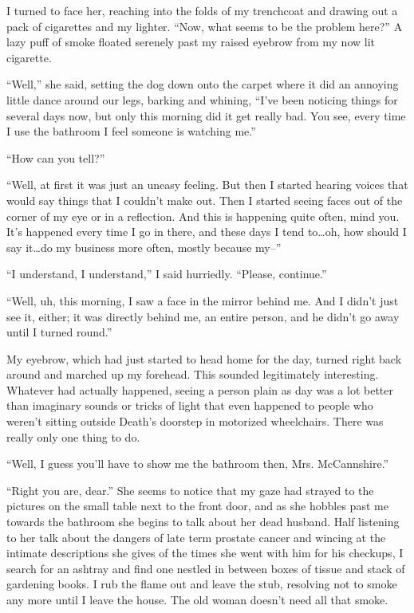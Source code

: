 I turned to face her, reaching into the folds of my trenchcoat and
drawing out a pack of cigarettes and my lighter. ``Now, what seems
to be the problem here?'' A lazy puff of smoke floated serenely past
my raised eyebrow from my now lit cigarette.



``Well,'' she said, setting the dog down onto the carpet where it did
an annoying little dance around our legs, barking and whining,
``I've been noticing things for several days now, but only this
morning did it get really bad. You see, every time I use the
bathroom I feel someone is watching me.''



``How can you tell?''



``Well, at first it was just an uneasy feeling. But then I started
hearing voices that would say things that I couldn't make out. Then
I started seeing faces out of the corner of my eye or in a
reflection. And this is happening quite often, mind you. It's
happened every time I go in there, and these days I tend to{\ldots}oh,
how should I say it{\ldots}do my business more often, mostly because
my--''



``I understand, I understand,'' I said hurriedly. ``Please,
continue.''



``Well, uh, this morning, I saw a face in the mirror behind me. And
I didn't just see it, either; it was directly behind me, an entire
person, and he didn't go away until I turned round.''



My eyebrow, which had just started to head home for the day, turned
right back around and marched up my forehead. This sounded
legitimately interesting. Whatever had actually happened, seeing a
person plain as day was a lot better than imaginary sounds or
tricks of light that even happened to people who weren't sitting
outside Death's doorstep in motorized wheelchairs. There was really
only one thing to do.



``Well, I guess you'll have to show me the bathroom then, Mrs.
McCannshire.''



``Right you are, dear.'' She seems to notice that my gaze had strayed
to the pictures on the small table next to the front door, and as
she hobbles past me towards the bathroom she begins to talk about
her dead husband. Half listening to her talk about the dangers of
late term prostate cancer and wincing at the intimate descriptions
she gives of the times she went with him for his checkups, I search
for an ashtray and find one nestled in between boxes of tissue and
stack of gardening books. I rub the flame out and leave the stub,
resolving not to smoke any more until I leave the house. The old
woman doesn't need all that smoke.



